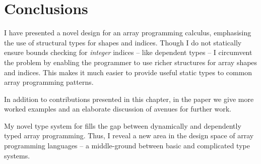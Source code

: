 \section{Conclusions}

I have presented a novel design for an array programming calculus, emphasising the use of structural types for shapes and indices. 
Though I do not statically ensure bounds checking for \emph{integer} indices -- like dependent types -- I circumvent the problem by enabling the programmer to use richer structures for array shapes and indices. 
This makes it much easier to provide useful static types to common array programming patterns. 

In addition to contributions presented in this chapter, in the paper \cite{star} we give more worked examples and an elaborate discussion of avenues for further work.

My novel type system for \starr{} fills the gap between dynamically and dependently typed array programming. Thus, I reveal a new area in the design space of array programming languages -- a middle-ground between basic and complicated type systems.

